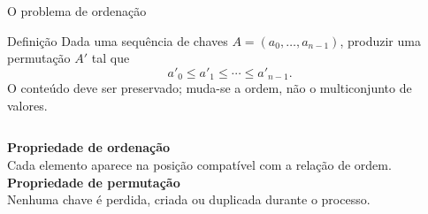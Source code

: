 \documentclass[aspectratio=169,11pt]{beamer}
\newcommand{\citep}[1]{{\color{MidGray}\tiny\cite{#1}}}
\begin{document}
\begin{frame}{O problema de ordenação}
  \begin{block}{Definição}
    Dada uma sequência de chaves \(A=(a_0,\ldots,a_{n-1})\), produzir uma permutação \(A'\) tal que
    \[
      a'_0\leq a'_1\leq\cdots\leq a'_{n-1}.
    \]
    O conteúdo deve ser preservado; muda-se a ordem, não o multiconjunto de valores.
  \end{block}
  \vspace{.4em}
  \begin{columns}[T,onlytextwidth]
      \textbf{Propriedade de ordenação}\\
      Cada elemento aparece na posição compatível com a relação de ordem.
      \textbf{Propriedade de permutação}\\
      Nenhuma chave é perdida, criada ou duplicada durante o processo.
  \end{columns}
  \vfill
  \citep{cormen2022,knuth1998}
\end{frame}
\end{document}
